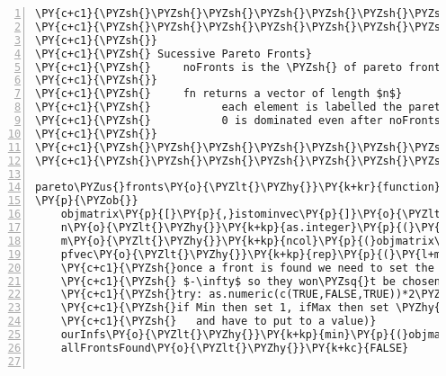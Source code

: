 \begin{Verbatim}[commandchars=\\\{\},codes={\catcode`\$=3\catcode`\^=7\catcode`\_=8},gobble=0,numbers=left,fontfamily=fvm,fontshape=n,fontsize=\footnotesize,tabsize=2]
\PY{c+c1}{\PYZsh{}\PYZsh{}\PYZsh{}\PYZsh{}\PYZsh{}\PYZsh{}\PYZsh{}\PYZsh{}\PYZsh{}\PYZsh{}\PYZsh{}\PYZsh{}\PYZsh{}\PYZsh{}\PYZsh{}\PYZsh{}\PYZsh{}\PYZsh{}\PYZsh{}\PYZsh{}\PYZsh{}\PYZsh{}\PYZsh{}\PYZsh{}\PYZsh{}\PYZsh{}\PYZsh{}\PYZsh{}\PYZsh{}\PYZsh{}\PYZsh{}\PYZsh{}\PYZsh{}\PYZsh{}\PYZsh{}\PYZsh{}\PYZsh{}\PYZsh{}\PYZsh{}\PYZsh{}\PYZsh{}\PYZsh{}}
\PY{c+c1}{\PYZsh{}\PYZsh{}\PYZsh{}\PYZsh{}\PYZsh{}\PYZsh{}\PYZsh{}\PYZsh{}\PYZsh{}\PYZsh{}\PYZsh{}\PYZsh{}\PYZsh{}\PYZsh{}\PYZsh{}\PYZsh{}\PYZsh{}\PYZsh{}\PYZsh{}\PYZsh{}\PYZsh{}\PYZsh{}\PYZsh{}\PYZsh{}\PYZsh{}\PYZsh{}\PYZsh{}\PYZsh{}\PYZsh{}\PYZsh{}\PYZsh{}\PYZsh{}\PYZsh{}\PYZsh{}\PYZsh{}\PYZsh{}\PYZsh{}\PYZsh{}\PYZsh{}\PYZsh{}\PYZsh{}\PYZsh{}}
\PY{c+c1}{\PYZsh{}}
\PY{c+c1}{\PYZsh{} Sucessive Pareto Fronts}
\PY{c+c1}{\PYZsh{}     noFronts is the \PYZsh{} of pareto fronts required}
\PY{c+c1}{\PYZsh{}}
\PY{c+c1}{\PYZsh{}     fn returns a vector of length $n$}
\PY{c+c1}{\PYZsh{}           each element is labelled the pareto front \PYZsh{},  }
\PY{c+c1}{\PYZsh{}           0 is dominated even after noFronts found}
\PY{c+c1}{\PYZsh{}}
\PY{c+c1}{\PYZsh{}\PYZsh{}\PYZsh{}\PYZsh{}\PYZsh{}\PYZsh{}\PYZsh{}\PYZsh{}\PYZsh{}\PYZsh{}\PYZsh{}\PYZsh{}\PYZsh{}\PYZsh{}\PYZsh{}\PYZsh{}\PYZsh{}\PYZsh{}\PYZsh{}\PYZsh{}\PYZsh{}\PYZsh{}\PYZsh{}\PYZsh{}\PYZsh{}\PYZsh{}\PYZsh{}\PYZsh{}\PYZsh{}\PYZsh{}\PYZsh{}\PYZsh{}\PYZsh{}\PYZsh{}\PYZsh{}\PYZsh{}\PYZsh{}\PYZsh{}\PYZsh{}\PYZsh{}\PYZsh{}\PYZsh{}}
\PY{c+c1}{\PYZsh{}\PYZsh{}\PYZsh{}\PYZsh{}\PYZsh{}\PYZsh{}\PYZsh{}\PYZsh{}\PYZsh{}\PYZsh{}\PYZsh{}\PYZsh{}\PYZsh{}\PYZsh{}\PYZsh{}\PYZsh{}\PYZsh{}\PYZsh{}\PYZsh{}\PYZsh{}\PYZsh{}\PYZsh{}\PYZsh{}\PYZsh{}\PYZsh{}\PYZsh{}\PYZsh{}\PYZsh{}\PYZsh{}\PYZsh{}\PYZsh{}\PYZsh{}\PYZsh{}\PYZsh{}\PYZsh{}\PYZsh{}\PYZsh{}\PYZsh{}\PYZsh{}\PYZsh{}\PYZsh{}\PYZsh{}}

pareto\PYZus{}fronts\PY{o}{\PYZlt{}\PYZhy{}}\PY{k+kr}{function}\PY{p}{(}noFronts\PY{p}{,}objmatrix\PY{p}{,}istominvec\PY{p}{)}
\PY{p}{\PYZob{}}
	objmatrix\PY{p}{[}\PY{p}{,}istominvec\PY{p}{]}\PY{o}{\PYZlt{}\PYZhy{}} \PY{o}{\PYZhy{}}objmatrix\PY{p}{[}\PY{p}{,}istominvec\PY{p}{]}
	n\PY{o}{\PYZlt{}\PYZhy{}}\PY{k+kp}{as.integer}\PY{p}{(}\PY{k+kp}{nrow}\PY{p}{(}objmatrix\PY{p}{)}\PY{p}{)}
	m\PY{o}{\PYZlt{}\PYZhy{}}\PY{k+kp}{ncol}\PY{p}{(}objmatrix\PY{p}{)}
	pfvec\PY{o}{\PYZlt{}\PYZhy{}}\PY{k+kp}{rep}\PY{p}{(}\PY{l+m}{0}\PY{p}{,}n\PY{p}{)} \PY{c+c1}{\PYZsh{}output vector}
	\PY{c+c1}{\PYZsh{}once a front is found we need to set the correponding values to $\infty$ or }
	\PY{c+c1}{\PYZsh{} $-\infty$ so they won\PYZsq{}t be chosen again}
	\PY{c+c1}{\PYZsh{}try: as.numeric(c(TRUE,FALSE,TRUE))*2\PYZhy{}1 to see what the next line is doing}
	\PY{c+c1}{\PYZsh{}if Min then set 1, ifMax then set \PYZhy{}1 (the sign of the Inf if we find front }
	\PY{c+c1}{\PYZsh{}	 and have to put to a value)}
	ourInfs\PY{o}{\PYZlt{}\PYZhy{}}\PY{k+kp}{min}\PY{p}{(}objmatrix\PY{p}{)}\PY{l+m}{\PYZhy{}1}
	allFrontsFound\PY{o}{\PYZlt{}\PYZhy{}}\PY{k+kc}{FALSE}
	

\end{Verbatim}
